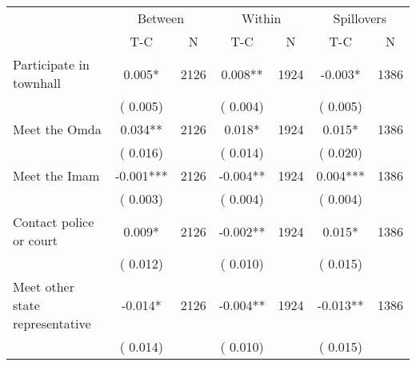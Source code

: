
\begin{tabular}{l*{6}{c}}\hline&\multicolumn{2}{c}{Between}&\multicolumn{2}{c}{Within}&\multicolumn{2}{c}{Spillovers} \\ \cmidrule(r){2-3}\cmidrule(l){4-5}\cmidrule(l){6-7} & {T-C} & {N} & {T-C} & {N}  & {T-C}  & {N}  \\ \midrule
Participate in townhall        &              0.005*      &       2126       &              0.008**      &       1924       &             -0.003*      &       1386       \\
                       &       (       0.005)            &                               &       (       0.004)            &                               &       (       0.005)            &                               \\
Meet the Omda        &              0.034**      &       2126       &              0.018*      &       1924       &              0.015*      &       1386       \\
                       &       (       0.016)            &                               &       (       0.014)            &                               &       (       0.020)            &                               \\
Meet the Imam        &             -0.001***      &       2126       &             -0.004**      &       1924       &              0.004***      &       1386       \\
                       &       (       0.003)            &                               &       (       0.004)            &                               &       (       0.004)            &                               \\
Contact police or court        &              0.009*      &       2126       &             -0.002**      &       1924       &              0.015*      &       1386       \\
                       &       (       0.012)            &                               &       (       0.010)            &                               &       (       0.015)            &                               \\
Meet other state representative        &             -0.014*      &       2126       &             -0.004**      &       1924       &             -0.013**      &       1386       \\
                       &       (       0.014)            &                               &       (       0.010)            &                               &       (       0.015)            &                               \\

\end{tabular}
